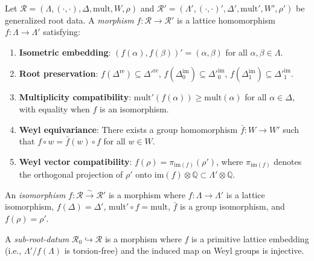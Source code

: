 \begin{definition}
\label{def:morphism-root-data}
Let $\mathcal{R} = (\Lambda, (\cdot,\cdot), \Delta, \mathrm{mult}, W, \rho)$ and $\mathcal{R}' = (\Lambda', (\cdot,\cdot)', \Delta', \mathrm{mult}', W', \rho')$ be generalized root data. A \emph{morphism} $f \colon \mathcal{R} \to \mathcal{R}'$ is a lattice homomorphism $f \colon \Lambda \to \Lambda'$ satisfying:
\begin{enumerate}[label=(\roman*)]
 \item \textbf{Isometric embedding}: $(f(\alpha), f(\beta))' = (\alpha, \beta)$ for all $\alpha, \beta \in \Lambda$.
 \item \textbf{Root preservation}: $f(\Delta^{\mathrm{re}}) \subseteq \Delta'^{\mathrm{re}}$, $f(\Delta^{\mathrm{im}}_0) \subseteq \Delta'^{\mathrm{im}}_0$, $f(\Delta^{\mathrm{im}}_1) \subseteq \Delta'^{\mathrm{im}}_1$.
 \item \textbf{Multiplicity compatibility}: $\mathrm{mult}'(f(\alpha)) \geq \mathrm{mult}(\alpha)$ for all $\alpha \in \Delta$, with equality when $f$ is an isomorphism.
 \item \textbf{Weyl equivariance}: There exists a group homomorphism $\bar{f} \colon W \to W'$ such that $f \circ w = \bar{f}(w) \circ f$ for all $w \in W$.
 \item \textbf{Weyl vector compatibility}: $f(\rho) = \pi_{\mathrm{im}(f)}(\rho')$, where $\pi_{\mathrm{im}(f)}$ denotes the orthogonal projection of $\rho'$ onto $\mathrm{im}(f) \otimes \mathbb{Q} \subset \Lambda' \otimes \mathbb{Q}$.
\end{enumerate}
\end{definition}

\begin{definition}
\label{def:iso-root-data}
An \emph{isomorphism} $f \colon \mathcal{R} \xrightarrow{\sim} \mathcal{R}'$ is a morphism where $f \colon \Lambda \to \Lambda'$ is a lattice isomorphism, $f(\Delta) = \Delta'$, $\mathrm{mult}' \circ f = \mathrm{mult}$, $\bar{f}$ is a group isomorphism, and $f(\rho) = \rho'$.
\end{definition}

\begin{definition}
\label{def:sub-root-datum}
A \emph{sub-root-datum} $\mathcal{R}_0 \hookrightarrow \mathcal{R}$ is a morphism where $f$ is a primitive lattice embedding (i.e., $\Lambda'/f(\Lambda)$ is torsion-free) and the induced map on Weyl groups is injective.
\end{definition}

